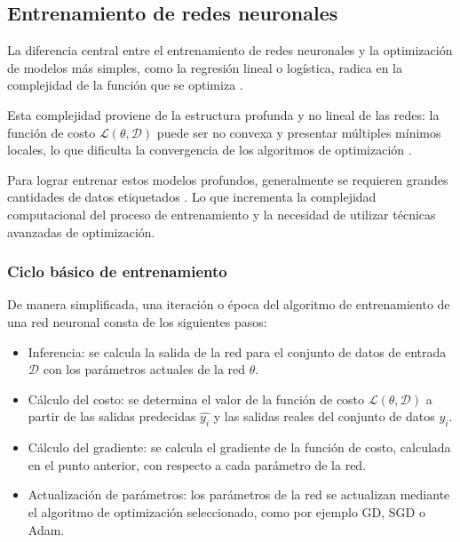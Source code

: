 \subsection{Entrenamiento de redes neuronales}
\label{sec:entrenamiento_redes_neuronales}

La diferencia central entre el entrenamiento de redes neuronales y la optimización de modelos más simples, como la regresión lineal o logística, radica en la complejidad de la función que se optimiza \cite{Goodfellow2016}.

Esta complejidad proviene de la estructura profunda y no lineal de las redes: la función de costo $\mathcal{L}(\theta, \mathcal{D})$ puede ser no convexa y presentar múltiples mínimos locales, lo que dificulta la convergencia de los algoritmos de optimización \cite{Goodfellow2016}.

Para lograr entrenar estos modelos profundos, generalmente se requieren grandes cantidades de datos etiquetados \cite{Goodfellow2016}. Lo que incrementa la complejidad computacional del proceso de entrenamiento y la necesidad de utilizar técnicas avanzadas de optimización.

\subsubsection{Ciclo básico de entrenamiento}
\label{sec:ciclo_entrenamiento}

De manera simplificada, una iteración o época del algoritmo de entrenamiento de una red neuronal consta de los siguientes pasos:

\begin{itemize}
    \item Inferencia: se calcula la salida de la red para el conjunto de datos de entrada $\mathcal{D}$ con los parámetros actuales de la red $\theta$.
    \item Cálculo del costo: se determina el valor de la función de costo $\mathcal{L}(\theta, \mathcal{D})$ a partir de las salidas predecidas $\hat{y_i}$ y las salidas reales del conjunto de datos $y_i$.
    \item Cálculo del gradiente: se calcula el gradiente de la función de costo, calculada en el punto anterior, con respecto a cada parámetro de la red.
    \item Actualización de parámetros: los parámetros de la red se actualizan mediante el algoritmo de optimización seleccionado, como por ejemplo GD, SGD o Adam.
\end{itemize}

